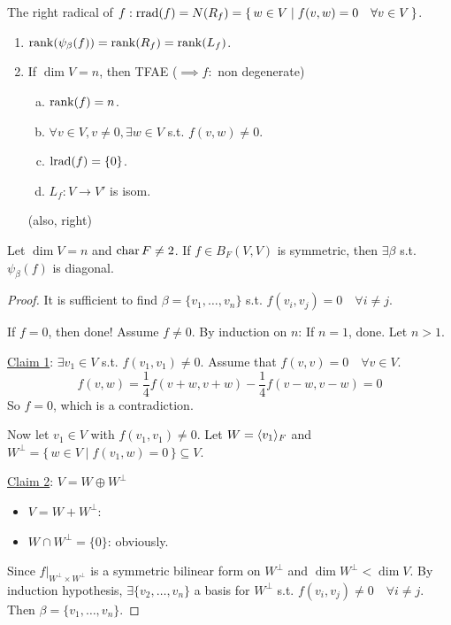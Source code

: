 The right radical of $f:
\operatorname{rrad}(f) = N(R_f) = \{\, w\in V \mid f(v, w) = 0 \quad \forall v \in V \,\}$.

\begin{exercise} \mbox{}
  \begin{enumerate}
    \item $\operatorname{rank}(\psi_\beta(f)) = \operatorname{rank}(R_f) = \operatorname{rank}(L_f)$.
    \item If $\dim V = n$, then TFAE ($\implies f:$ non degenerate)
      \begin{enumerate}[(a)]
        \item $\operatorname{rank}(f) = n$.
        \item $\forall v \in V, v \ne 0, \exists w \in V$ s.t. $f(v,w) \ne 0$.
        \item $\operatorname{lrad}(f) = \{0\}$.
        \item $L_f: V \to V'$ is isom.
      \end{enumerate}
      (also, right)
  \end{enumerate}
\end{exercise}

\begin{theorem}
  Let $\dim V = n$ and $\operatorname{char} F \ne 2$.
  If $f \in B_F(V, V)$ is symmetric, then $\exists \beta$ s.t. $\psi_\beta(f)$
  is diagonal.

  \begin{proof}
    It is sufficient to find $\beta = \{v_1, \dots, v_n\}$ s.t.
    $f(v_i, v_j) = 0 \quad \forall i \ne j$.

    If $f = 0$, then done! Assume $f \ne 0$.
    By induction on $n$: If $n = 1$, done.
    Let $n > 1$.

    \underline{Claim 1}: $\exists v_1 \in V$ s.t. $f(v_1, v_1) \ne 0$.
    Assume that $f(v, v) = 0 \quad \forall v \in V$.
    \[
      f(v, w) = \frac{1}{4}f(v+w,v+w) - \frac{1}{4}f(v-w,v-w) = 0
    \]
    So $f = 0$, which is a contradiction.

    Now let $v_1 \in V$ with $f(v_1, v_1) \ne 0$. Let $W = \langle v_1\rangle_F$ and
    $W^\perp = \{\, w \in V \mid f(v_1, w) = 0 \,\} \subseteq V$.

    \underline{Claim 2}: $V = W \oplus W^\perp$
    \begin{itemize}
      \item $V = W + W^\perp$: 
      \item $W \cap W^\perp = \{0\}$: obviously.
    \end{itemize}

    Since $f \Big|_{W^\perp \times W^\perp}$ is a symmetric bilinear form
    on $W^\perp$ and $\dim W^\perp < \dim V$.
    By induction hypothesis, $\exists \{ v_2, \dots, v_n \}$ a basis for
    $W^\perp$ s.t. $f(v_i, v_j) \ne 0 \quad \forall i \ne j$. Then
    $\beta = \{v_1, \dots, v_n \}$.
  \end{proof}
\end{theorem}

